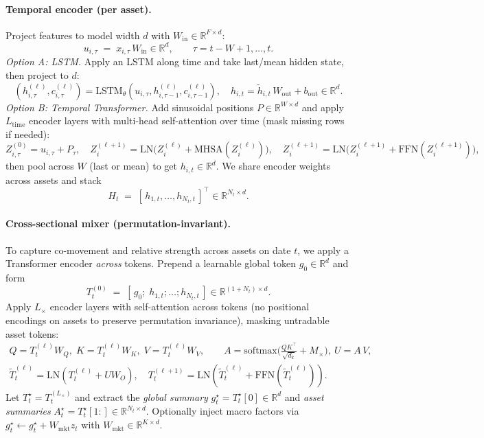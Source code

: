 \documentclass[10pt,leqno]{amsart}
\begin{document}
\paragraph{Temporal encoder (per asset).}
Project features to model width $d$ with $W_{\mathrm{in}}\in\mathbb{R}^{F\times d}$:
\[
u_{i,\tau} \;=\; x_{i,\tau}\, W_{\mathrm{in}} \in \mathbb{R}^{d},\qquad \tau=t\!-\!W\!+\!1,\ldots,t.
\]
\textit{Option A: LSTM.} Apply an LSTM along time and take last/mean hidden state, then project to $d$:
\[
(h^{(\ell)}_{i,\tau},c^{(\ell)}_{i,\tau})=\mathrm{LSTM}_\theta(u_{i,\tau},h^{(\ell)}_{i,\tau-1},c^{(\ell)}_{i,\tau-1}),\quad
h_{i,t}=\tilde h_{i,t}\,W_{\mathrm{out}}+b_{\mathrm{out}}\in\mathbb{R}^{d}.
\]
\textit{Option B: Temporal Transformer.} Add sinusoidal positions $P\in\mathbb{R}^{W\times d}$ and apply $L_{\mathrm{time}}$ encoder layers with multi-head self-attention over time (mask missing rows if needed):
\[
Z^{(0)}_{i,\tau}=u_{i,\tau}+P_\tau,\quad
Z^{(\ell+1)}_{i}=\mathrm{LN}\!\big(Z^{(\ell)}_{i}+\mathrm{MHSA}(Z^{(\ell)}_{i})\big),\quad
Z^{(\ell+1)}_{i}=\mathrm{LN}\!\big(Z^{(\ell+1)}_{i}+\mathrm{FFN}(Z^{(\ell+1)}_{i})\big),
\]
then pool across $W$ (last or mean) to get $h_{i,t}\in\mathbb{R}^{d}$. We share encoder weights across assets and stack
\[
H_t \;=\; [\,h_{1,t},\ldots,h_{N_t,t}\,]^\top \in \mathbb{R}^{N_t\times d}.
\]

\paragraph{Cross-sectional mixer (permutation-invariant).}
To capture co-movement and relative strength across assets on date $t$, we apply a Transformer encoder \emph{across} tokens. Prepend a learnable global token $g_0\in\mathbb{R}^{d}$ and form
\[
T^{(0)}_t \;=\; [\,g_0;\; h_{1,t};\ldots;h_{N_t,t}\,]\in\mathbb{R}^{(1+N_t)\times d}.
\]
Apply $L_{\times}$ encoder layers with self-attention across tokens (no positional encodings on assets to preserve permutation invariance), masking untradable asset tokens:
\[
\begin{aligned}
Q=T^{(\ell)}_t W_Q,\; K=T^{(\ell)}_t W_K,\; V=T^{(\ell)}_t W_V,\qquad
A=\mathrm{softmax}\!\big(\tfrac{QK^\top}{\sqrt{d_k}}+M_{\times}\big),\ U=A\,V,\\
\tilde T^{(\ell)}_t=\mathrm{LN}(T^{(\ell)}_t+U W_O),\quad
T^{(\ell+1)}_t=\mathrm{LN}(\tilde T^{(\ell)}_t+\mathrm{FFN}(\tilde T^{(\ell)}_t)).
\end{aligned}
\]
Let $T^\star_t=T^{(L_{\times})}_t$ and extract the \emph{global summary} $g^\star_t=T^\star_t[0]\in\mathbb{R}^{d}$ and \emph{asset summaries} $A^\star_t=T^\star_t[1:]\in\mathbb{R}^{N_t\times d}$. Optionally inject macro factors via $g^\star_t \leftarrow g^\star_t + W_{\mathrm{mkt}} z_t$ with $W_{\mathrm{mkt}}\in\mathbb{R}^{K\times d}$.
\end{document}
